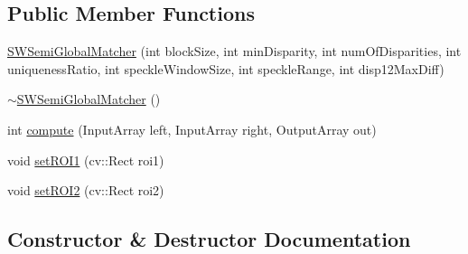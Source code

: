 \subsection*{Public Member Functions}
\begin{DoxyCompactItemize}
\item 
\hyperlink{classSWSemiGlobalMatcher_a8ceda1c4cffa5b5df7540f0e8efccc7c}{S\+W\+Semi\+Global\+Matcher} (int block\+Size, int min\+Disparity, int num\+Of\+Disparities, int uniqueness\+Ratio, int speckle\+Window\+Size, int speckle\+Range, int disp12\+Max\+Diff)
\item 
\hyperlink{classSWSemiGlobalMatcher_a77760cac2e94267ca6c8de7511eed163}{$\sim$\+S\+W\+Semi\+Global\+Matcher} ()
\item 
int \hyperlink{classSWSemiGlobalMatcher_a08419285671190aad745993fa6d8724e}{compute} (Input\+Array left, Input\+Array right, Output\+Array out)
\item 
void \hyperlink{classSWSemiGlobalMatcher_a67bf29294ea497441037616b1fb32769}{set\+R\+O\+I1} (cv\+::\+Rect roi1)
\item 
void \hyperlink{classSWSemiGlobalMatcher_a8cfa467d703b6a38cbd9e3ff1f9a3f70}{set\+R\+O\+I2} (cv\+::\+Rect roi2)
\end{DoxyCompactItemize}


\subsection{Constructor \& Destructor Documentation}

